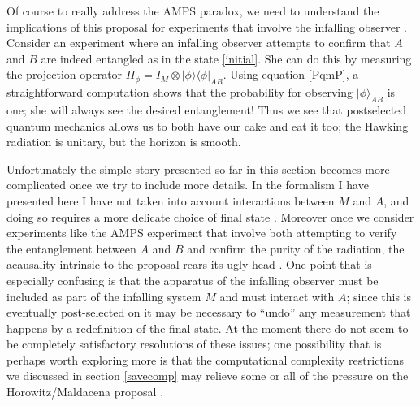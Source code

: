 \documentclass[12pt]{article}
\newcommand{\lan}{\langle}
\newcommand{\ran}{\rangle}
\begin{document}
Of course to really address the AMPS paradox, we need to understand the implications of this proposal for experiments that involve the infalling observer \cite{Lloyd:2013bza,Bousso:2013uka}.  Consider an experiment where an infalling observer attempts to confirm that $A$ and $B$ are indeed entangled as in the state \eqref{initial}.  She can do this by measuring the projection operator $\Pi_\phi=I_M\otimes|\phi\ran\lan\phi|_{AB}$.  Using equation \eqref{PqmP}, a straightforward computation shows that the probability for observing $|\phi\ran_{AB}$ is one; she will always see the desired entanglement!  Thus we see that postselected quantum mechanics allows us to both have our cake and eat it too; the Hawking radiation is unitary, but the horizon is smooth.

Unfortunately the simple story presented so far in this section becomes more complicated once we try to include more details.  In the formalism I have presented here I have not taken into account interactions between $M$ and $A$, and doing so requires a more delicate choice of final state \cite{Gottesman:2003up}.  Moreover once we consider experiments like the AMPS experiment that involve both attempting to verify the entanglement between $A$ and $B$ and confirm the purity of the radiation, the acausality intrinsic to the proposal rears its ugly head \cite{Bousso:2013uka,Lloyd:2013bza}.  One point that is especially confusing is that the apparatus of the infalling observer must be included as part of the infalling system $M$ and must interact with $A$; since this is eventually post-selected on it may be necessary to ``undo'' any measurement that happens by a redefinition of the final state.  At the moment there do not seem to be completely satisfactory resolutions of these issues; one possibility that is perhaps worth exploring more is that the computational complexity restrictions we discussed in section \ref{savecomp} may relieve some or all of the pressure on the Horowitz/Maldacena proposal \cite{Bousso:2013uka,Lloyd:2013bza}.  
\end{document}
